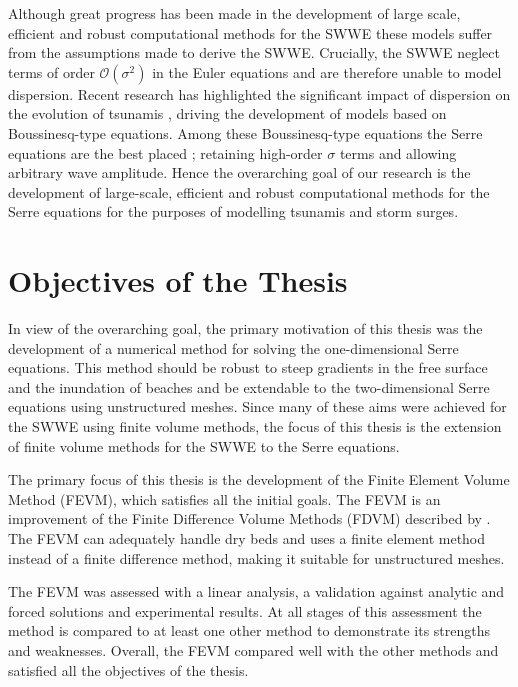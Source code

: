
Although great progress has been made in the development of large scale, efficient and robust computational methods for the SWWE \cite{ClawPack,ANUGA} these models suffer from the assumptions made to derive the SWWE. Crucially, the SWWE neglect terms of order $\mathcal{O}\left(\sigma ^2\right)$ in the Euler equations and are therefore unable to model dispersion. Recent research has highlighted the significant impact of dispersion on the evolution of tsunamis \cite{Grue-etal-2008-113,Kirby-etal-2013-39}, driving the development of models based on Boussinesq-type equations. Among these Boussinesq-type equations the Serre equations are the best placed \cite{Bonneton-Lannes-2009-16601}; retaining high-order $\sigma$ terms and allowing arbitrary wave amplitude. Hence the overarching goal of our research is the development of large-scale, efficient and robust computational methods for the Serre equations for the purposes of modelling tsunamis and storm surges.

\section{Objectives of the Thesis}
In view of the overarching goal, the primary motivation of this thesis was the development of a numerical method for solving the one-dimensional Serre equations. This method should be robust to steep gradients in the free surface and the inundation of beaches and be extendable to the two-dimensional Serre equations using unstructured meshes. Since many of these aims were achieved for the SWWE using finite volume methods, the focus of this thesis is the extension of finite volume methods for the SWWE to the Serre equations. 

The primary focus of this thesis is the development of the Finite Element Volume Method (FEVM), which satisfies all the initial goals. The FEVM is an improvement of the Finite Difference Volume Methods (FDVM) described by \citet{Zoppou-2014}. The FEVM can adequately handle dry beds and uses a finite element method instead of a finite difference method, making it suitable for unstructured meshes. 

The FEVM was assessed with a linear analysis, a validation against analytic and forced solutions and experimental results. At all stages of this assessment the method is compared to at least one other method to demonstrate its strengths and weaknesses. Overall, the FEVM compared well with the other methods and satisfied all the objectives of the thesis.

